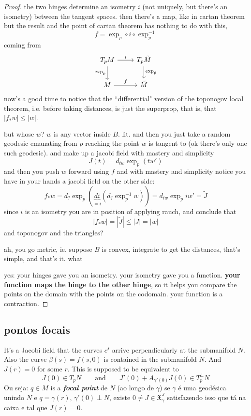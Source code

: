 \begin{proof}\leavevmode
the two hinges determine an isometry \(i\) (not uniquely, but there's an isometry) between the tangent spaces. then there's a map, like in cartan theorem but the result and the point of cartan theorem has nothing to do with this,
 \[f=\operatorname{exp}_{\tilde{p}}\circ i \circ \operatorname{exp}_p^{-1}\]
coming from
\[\begin{tikzcd}
	T_pM \arrow[r,"i"]\arrow[d,"\operatorname{exp}_p",swap]&T_p\tilde{M}\arrow[d,"\operatorname{exp}_{\tilde{p}}"]\\
	M\arrow[r,"f"]& \tilde{M}
\end{tikzcd}\]
now's a good time to notice that the ``differential" version of the toponogov local theorem, i.e. before taking distances, is just the superprop, that is, that \(|f_*w|\leq |w|\).

but whose \(w\)? \(w\) is any vector inside \(B\). lit. and then you just take a random geodesic emanating from \(p\) reaching the point \(w\) is tangent to (ok there's only one such geodesic). and make up a jacobi field with mastery and simplicity
\[J(t)=d_{tw}\operatorname{exp}_p(tw')\]
and then you push \(w\) forward using \(f\) and with mastery and simplicity notice you have in your hands a jacobi field on the other side:
\[f_*w=d_{?}\operatorname{exp}_{\tilde{p}}(\underbrace{di}_{=i}(d_?\operatorname{exp}_p^{-1}w))=d_{iw}\operatorname{exp}_{\tilde{p}}i w'=\tilde{J}\]
since \(i\) is an isometry you are in position of applying rauch, and conclude that
\[|f_*w|=|\tilde{J}|\leq |J|=|w|\]
\hfill and toponogov and the triangles?

ah, you go metric, ie. suppose \(B\) is convex, integrate to get the distances, that's simple, and that's it. what

yes: your hinges gave you an isometry. your isometry gave you a function. \textbf{your function maps the hinge to the other hinge}, so it helps you compare the points on the domain with the points on the codomain. your function is a contraction.\end{proof}

\subsection{pontos focais}

It's a Jacobi field that the curves \(c^s\) arrive perpendicularly at the submanifold \(N\). Also the curve \(\beta(s)=f(s,0)\) is contained in the submanifold \(N\). And \(J(r)=0\) for some \(r\). This is supposed to be equivalent to 
\[J(0) \in T_p N\qquad  \text{and} \qquad J'(0)+A_{\gamma'(0)}J(0) \in T_p^{\perp}N\]
Ou seja: \(q \in M\) is a \textit{\textbf{focal point}} de \(N\) (ao longo de \(\gamma\)) se \(\gamma\) é uma geodésica unindo \(N\) e \(q=\gamma(r)\), \(\gamma'(0) \perp N\), existe \(0 \neq  J \in \mathfrak{X}^J_\gamma\) satisfazendo isso que tá na caixa e tal que \(J(r)=0\).

